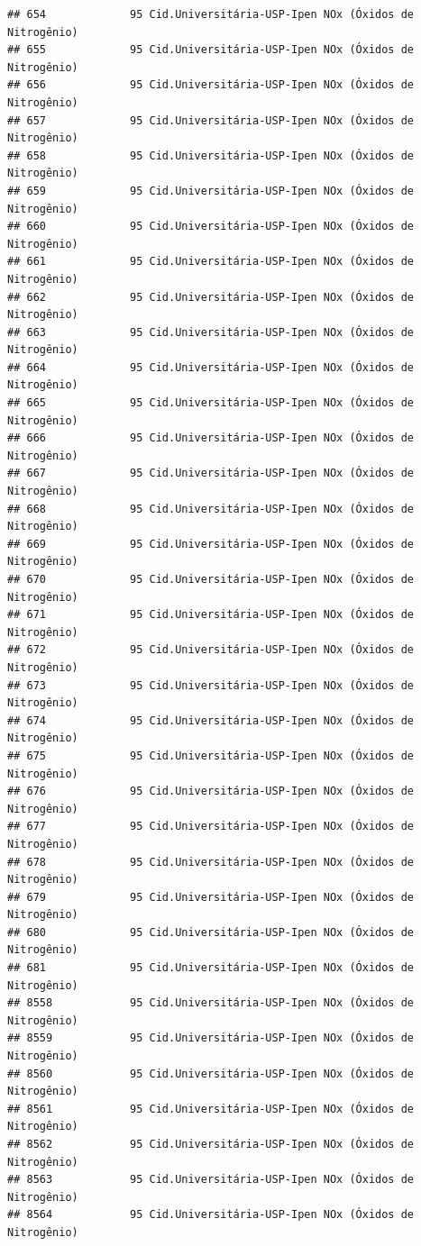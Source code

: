 \documentclass[]{book}
\begin{document}
\begin{verbatim}
## 654             95 Cid.Universitária-USP-Ipen NOx (Óxidos de Nitrogênio)
## 655             95 Cid.Universitária-USP-Ipen NOx (Óxidos de Nitrogênio)
## 656             95 Cid.Universitária-USP-Ipen NOx (Óxidos de Nitrogênio)
## 657             95 Cid.Universitária-USP-Ipen NOx (Óxidos de Nitrogênio)
## 658             95 Cid.Universitária-USP-Ipen NOx (Óxidos de Nitrogênio)
## 659             95 Cid.Universitária-USP-Ipen NOx (Óxidos de Nitrogênio)
## 660             95 Cid.Universitária-USP-Ipen NOx (Óxidos de Nitrogênio)
## 661             95 Cid.Universitária-USP-Ipen NOx (Óxidos de Nitrogênio)
## 662             95 Cid.Universitária-USP-Ipen NOx (Óxidos de Nitrogênio)
## 663             95 Cid.Universitária-USP-Ipen NOx (Óxidos de Nitrogênio)
## 664             95 Cid.Universitária-USP-Ipen NOx (Óxidos de Nitrogênio)
## 665             95 Cid.Universitária-USP-Ipen NOx (Óxidos de Nitrogênio)
## 666             95 Cid.Universitária-USP-Ipen NOx (Óxidos de Nitrogênio)
## 667             95 Cid.Universitária-USP-Ipen NOx (Óxidos de Nitrogênio)
## 668             95 Cid.Universitária-USP-Ipen NOx (Óxidos de Nitrogênio)
## 669             95 Cid.Universitária-USP-Ipen NOx (Óxidos de Nitrogênio)
## 670             95 Cid.Universitária-USP-Ipen NOx (Óxidos de Nitrogênio)
## 671             95 Cid.Universitária-USP-Ipen NOx (Óxidos de Nitrogênio)
## 672             95 Cid.Universitária-USP-Ipen NOx (Óxidos de Nitrogênio)
## 673             95 Cid.Universitária-USP-Ipen NOx (Óxidos de Nitrogênio)
## 674             95 Cid.Universitária-USP-Ipen NOx (Óxidos de Nitrogênio)
## 675             95 Cid.Universitária-USP-Ipen NOx (Óxidos de Nitrogênio)
## 676             95 Cid.Universitária-USP-Ipen NOx (Óxidos de Nitrogênio)
## 677             95 Cid.Universitária-USP-Ipen NOx (Óxidos de Nitrogênio)
## 678             95 Cid.Universitária-USP-Ipen NOx (Óxidos de Nitrogênio)
## 679             95 Cid.Universitária-USP-Ipen NOx (Óxidos de Nitrogênio)
## 680             95 Cid.Universitária-USP-Ipen NOx (Óxidos de Nitrogênio)
## 681             95 Cid.Universitária-USP-Ipen NOx (Óxidos de Nitrogênio)
## 8558            95 Cid.Universitária-USP-Ipen NOx (Óxidos de Nitrogênio)
## 8559            95 Cid.Universitária-USP-Ipen NOx (Óxidos de Nitrogênio)
## 8560            95 Cid.Universitária-USP-Ipen NOx (Óxidos de Nitrogênio)
## 8561            95 Cid.Universitária-USP-Ipen NOx (Óxidos de Nitrogênio)
## 8562            95 Cid.Universitária-USP-Ipen NOx (Óxidos de Nitrogênio)
## 8563            95 Cid.Universitária-USP-Ipen NOx (Óxidos de Nitrogênio)
## 8564            95 Cid.Universitária-USP-Ipen NOx (Óxidos de Nitrogênio)

\end{verbatim}
\end{document}
